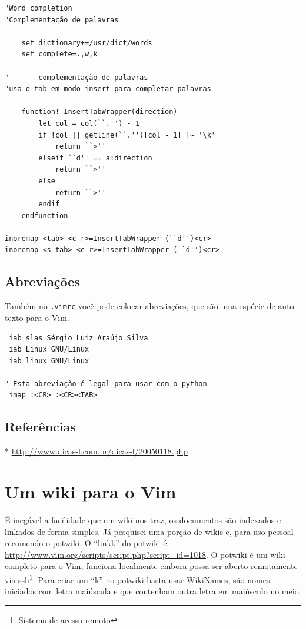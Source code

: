 \documentclass[10pt,a4paper,openany]{book}
\begin{document}
\begin{verbatim}
"Word completion
"Complementação de palavras

	set dictionary+=/usr/dict/words
	set complete=.,w,k

"------ complementação de palavras ----
"usa o tab em modo insert para completar palavras

	function! InsertTabWrapper(direction)
		let col = col(``.'') - 1
		if !col || getline(``.'')[col - 1] !~ '\k'
			return ``>''
		elseif ``d'' == a:direction
			return ``>''
		else
			return ``>''
		endif
	endfunction

inoremap <tab> <c-r>=InsertTabWrapper (``d'')<cr>
inoremap <s-tab> <c-r>=InsertTabWrapper (``d'')<cr>
\end{verbatim}

\section{Abreviações}\label{Abreviações}
Também no \verb|.vimrc| você pode colocar abreviações, que são uma espécie de
auto-texto para o Vim.

\begin{verbatim}
 iab slas Sérgio Luiz Araújo Silva
 iab Linux GNU/Linux
 iab linux GNU/Linux

" Esta abreviação é legal para usar com o python
 imap :<CR> :<CR><TAB>
\end{verbatim}

\section{Referências}
\label{Referências}
* \url{http://www.dicas-l.com.br/dicas-l/20050118.php}

\chapter{Um wiki para o Vim}\label{cha:Um wiki para o Vim}

É inegável a facilidade que um wiki nos traz, os documentos são
indexados e linkados de forma simples. Já pesquisei uma porção de
wikis e, para uso pessoal recomendo o potwiki.  O ``linkk'' do potwiki é:
\url{http://www.vim.org/scripts/script.php?script_id=1018}.
O potwiki é um wiki completo para o Vim, funciona localmente embora
possa ser aberto remotamente via ssh\footnote{Sistema de acesso remoto}.
Para criar um ``k'' no potwiki basta usar WikiNames, são nomes
iniciados com letra maiúscula e que contenham outra letra em maiúsculo
no meio. \\
\end{document}
